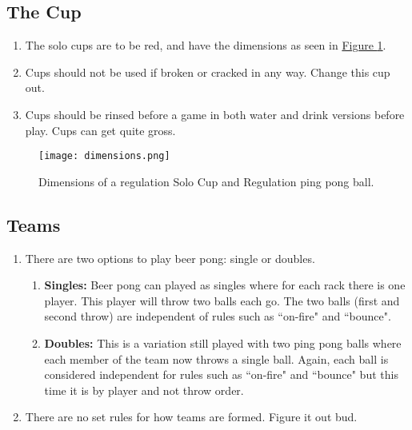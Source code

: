 	\subsection{The Cup}\label{ssec:Cup}
        \begin{enumerate}[label=(\roman*), ref=\roman*]
            \item \label{sssec:Cup,dim} The solo cups are to be red,  and have the dimensions as seen in \hyperref[fig:solocup]{Figure \ref*{fig:solocup}}. 
            \item \label{sssec:Cup,broken} Cups should not be used if broken or cracked in any way. Change this cup out. 
            \item \label{ssec:Cup,rinsing} Cups should be rinsed before a game in both water and drink versions before play. Cups can get quite gross. 
        \end{enumerate}
        \begin{figure}[H]
            \centering
            \texttt{[image: dimensions.png]}
            \caption{Dimensions of a regulation  Solo Cup and Regulation ping pong ball.}
            \label{fig:solocup}
        \end{figure}
	\subsection{Teams}\label{ssec:Teams}
		\begin{enumerate}[label=(\roman*), ref=\roman*]
            \item \label{sssec:teams,options} There are two options to play beer pong: single or doubles. 
                \begin{enumerate}[label=(\alph*), leftmargin=2cm]%
                    \item \textbf{Singles:} Beer pong can played as singles where for each rack there is one player.
                        This player will throw two balls each go. 
                        The two balls (first and second throw) are independent of rules such as ``on-fire" and ``bounce".
                    \item \textbf{Doubles:}	This is a variation still played with two ping pong balls where each member of the team now throws a single ball.
                        Again, each ball is considered independent for rules such as ``on-fire" and ``bounce" but this time it is by player and not throw order.
                \end{enumerate} 
            \item \label{sssec:teams,choosing} There are no set rules for how teams are formed. Figure it out bud. 
        \end{enumerate}
